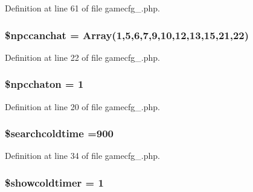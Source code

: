 Definition at line 61 of file gamecfg\+\_.\+php.

\hypertarget{gamecfg__1_8php_ac95e1ae6d28287b71f7f23c8b209c7f8}{
\subsubsection[{\$npccanchat}]{\setlength{\rightskip}{0pt plus 5cm}\$npccanchat = Array(1,5,6,7,9,10,12,13,15,21,22)}}\label{gamecfg__1_8php_ac95e1ae6d28287b71f7f23c8b209c7f8}


Definition at line 22 of file gamecfg\+\_.\+php.

\hypertarget{gamecfg__1_8php_a2d8d4ed7ff8d195298498d2d1f57538a}{
\subsubsection[{\$npcchaton}]{\setlength{\rightskip}{0pt plus 5cm}\$npcchaton = 1}}\label{gamecfg__1_8php_a2d8d4ed7ff8d195298498d2d1f57538a}


Definition at line 20 of file gamecfg\+\_.\+php.

\hypertarget{gamecfg__1_8php_a0d7f09edddf8dab3c6dc096c0cfd0f6a}{
\subsubsection[{\$searchcoldtime}]{\setlength{\rightskip}{0pt plus 5cm}\$searchcoldtime =900}}\label{gamecfg__1_8php_a0d7f09edddf8dab3c6dc096c0cfd0f6a}


Definition at line 34 of file gamecfg\+\_.\+php.

\hypertarget{gamecfg__1_8php_ae2bb65c1b1a88f0ea1745a4bb3872f76}{
\subsubsection[{\$showcoldtimer}]{\setlength{\rightskip}{0pt plus 5cm}\$showcoldtimer = 1}}\label{gamecfg__1_8php_ae2bb65c1b1a88f0ea1745a4bb3872f76}



